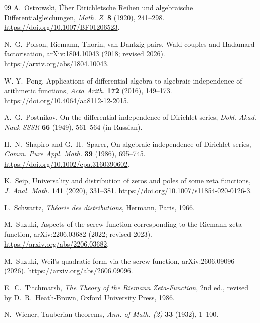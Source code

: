 \documentclass[11pt]{article}
\theoremstyle{definition}
\theoremstyle{remark}
\begin{document}
\begin{thebibliography}{99}
A.~Ostrowski,
\newblock \"Uber Dirichletsche Reihen und algebraische Differentialgleichungen,
\newblock \emph{Math. Z.} \textbf{8} (1920), 241--298.
\newblock \url{https://doi.org/10.1007/BF01206523}.

N.~G.~Polson,
\newblock Riemann, Thorin, van Dantzig pairs, Wald couples and Hadamard factorisation,
\newblock arXiv:1804.10043 (2018; revised 2026).
\newblock \url{https://arxiv.org/abs/1804.10043}.

W.-Y.~Pong,
\newblock Applications of differential algebra to algebraic independence of arithmetic
functions,
\newblock \emph{Acta Arith.} \textbf{172} (2016), 149--173.
\newblock \url{https://doi.org/10.4064/aa8112-12-2015}.

A.~G.~Postnikov,
\newblock On the differential independence of Dirichlet series,
\newblock \emph{Dokl. Akad. Nauk SSSR} \textbf{66} (1949), 561--564
\newblock (in Russian).

H.~N.~Shapiro and G.~H.~Sparer,
\newblock On algebraic independence of Dirichlet series,
\newblock \emph{Comm. Pure Appl. Math.} \textbf{39} (1986), 695--745.
\newblock \url{https://doi.org/10.1002/cpa.3160390602}.

K.~Seip,
\newblock Universality and distribution of zeros and poles of some zeta functions,
\newblock \emph{J. Anal. Math.} \textbf{141} (2020), 331--381.
\newblock \url{https://doi.org/10.1007/s11854-020-0126-3}.

L.~Schwartz,
\newblock \emph{Th\'eorie des distributions},
\newblock Hermann, Paris, 1966.

M.~Suzuki,
\newblock Aspects of the screw function corresponding to the Riemann zeta function,
\newblock arXiv:2206.03682 (2022; revised 2023).
\newblock \url{https://arxiv.org/abs/2206.03682}.

M.~Suzuki,
\newblock Weil's quadratic form via the screw function,
\newblock arXiv:2606.09096 (2026).
\newblock \url{https://arxiv.org/abs/2606.09096}.

E.~C.~Titchmarsh,
\newblock \emph{The Theory of the Riemann Zeta-Function}, 2nd ed.,
\newblock revised by D.~R.~Heath-Brown, Oxford University Press, 1986.

N.~Wiener,
\newblock Tauberian theorems,
\newblock \emph{Ann. of Math. (2)} \textbf{33} (1932), 1--100.

\end{thebibliography}
\end{document}
